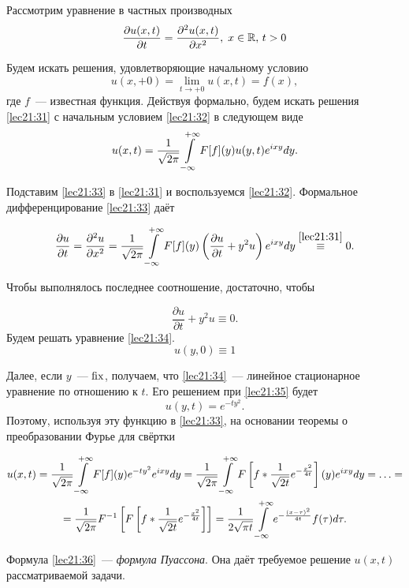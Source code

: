 \documentclass[../../main.tex]{subfiles}
\begin{document}
\begin{example}
Рассмотрим уравнение в частных производных
\begin{equation}
\label{lec21:31}
\frac{\partial u(x,t)}{\partial t} = \frac{\partial^2 u(x,t)}{\partial x^2}, 
\; x\in \mathbb{R}, \, t > 0
\end{equation}

Будем искать решения, удовлетворяющие начальному условию
\begin{equation}
  \label{lec21:32}
  u(x,+0) = \lim_{t\to+0} u(x,t) = f(x),
\end{equation}
где $f$~--- известная функция.
Действуя формально, будем искать решения \eqref{lec21:31}  с начальным 
условием \eqref{lec21:32} в следующем виде
\begin{equation}
  \label{lec21:33}
  u(x, t) = \frac{1}{\sqrt{2\pi}} \int\limits_{-\infty}^{+\infty} F[f](y)u(y,t)e^{ixy}dy.
\end{equation}

Подставим \eqref{lec21:33} в \eqref{lec21:31} и воспользуемся 
\eqref{lec21:32}. 
Формальное дифференцирование \eqref{lec21:33} даёт

\[\frac{\partial u}{\partial t} = \frac{\partial^2 u}{\partial x^2} = 
\frac{1}{\sqrt{2\pi}} \int\limits_{-\infty}^{+\infty} F[f](y)\left(\frac{\partial u}{\partial t} + 
y^2u\right)e^{ixy}dy \stackrel{\eqref{lec21:31}}{\equiv} 0.\]

Чтобы выполнялось последнее соотношение, достаточно, чтобы

\begin{equation}
\label{lec21:34}
\frac{\partial u}{\partial t} + y^2u \equiv 0.
\end{equation}
Будем решать уравнение \eqref{lec21:34}.
\begin{equation}
\label{lec21:35}
u(y,0) \equiv 1
\end{equation}

Далее, если $y$~--- $\operatorname{fix}$, получаем, что \eqref{lec21:34}~--- линейное 
стационарное уравнение по отношению к $t$. Его решением при \eqref{lec21:35} 
будет
\[u(y,t) = e^{-ty^2}.\]
Поэтому, используя эту функцию в \eqref{lec21:33}, на основании теоремы 
о преобразовании Фурье для свёртки

\begin{multline}
  \label{lec21:36}
  u(x,t) = \frac{1}{\sqrt{2\pi}} \int\limits_{-\infty}^{+\infty} F[f](y)e^{-ty^2}e^{ixy}dy =
  \frac{1}{\sqrt{2\pi}} \int\limits_{-\infty}^{+\infty} F\left[f * 
  \frac{1}{\sqrt{2t}}e^{-\frac{x^2}{4t}}
  \right](y)e^{ixy}dy = \ldots =\\= \frac{1}{\sqrt{2\pi}} 
  F^{-1}\left[F\left[f*\frac{1}{\sqrt{2t}}e^{-\frac{x^2}{4t}}\right]\right] =
  \frac{1}{2\sqrt{\pi t}} \int\limits_{-\infty}^{+\infty} e^{-\frac{(x-\tau)^2}{4t}}f(\tau)d\tau.
\end{multline}

Формула \eqref{lec21:36}~--- \emph{формула Пуассона}. Она даёт требуемое 
решение $u(x,t)$ рассматриваемой задачи.
\end{example}
\end{document}
